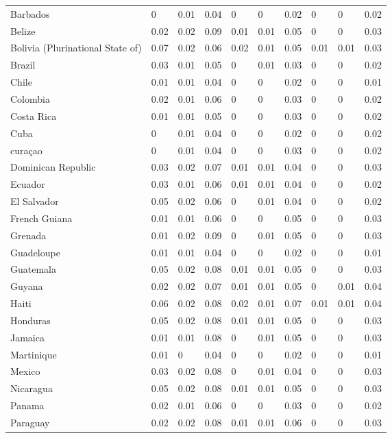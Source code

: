 \begin{longtable}[t]{llllllllll}
Barbados & 0 & 0.01 & 0.04 & 0 & 0 & 0.02 & 0 & 0 & 0.02\\
Belize & 0.02 & 0.02 & 0.09 & 0.01 & 0.01 & 0.05 & 0 & 0 & 0.03\\
Bolivia (Plurinational State of) & 0.07 & 0.02 & 0.06 & 0.02 & 0.01 & 0.05 & 0.01 & 0.01 & 0.03\\
Brazil & 0.03 & 0.01 & 0.05 & 0 & 0.01 & 0.03 & 0 & 0 & 0.02\\
Chile & 0.01 & 0.01 & 0.04 & 0 & 0 & 0.02 & 0 & 0 & 0.01\\
Colombia & 0.02 & 0.01 & 0.06 & 0 & 0 & 0.03 & 0 & 0 & 0.02\\
Costa Rica & 0.01 & 0.01 & 0.05 & 0 & 0 & 0.03 & 0 & 0 & 0.02\\
Cuba & 0 & 0.01 & 0.04 & 0 & 0 & 0.02 & 0 & 0 & 0.02\\
curaçao & 0 & 0.01 & 0.04 & 0 & 0 & 0.03 & 0 & 0 & 0.02\\
Dominican Republic & 0.03 & 0.02 & 0.07 & 0.01 & 0.01 & 0.04 & 0 & 0 & 0.03\\
Ecuador & 0.03 & 0.01 & 0.06 & 0.01 & 0.01 & 0.04 & 0 & 0 & 0.02\\
El Salvador & 0.05 & 0.02 & 0.06 & 0 & 0.01 & 0.04 & 0 & 0 & 0.02\\
French Guiana & 0.01 & 0.01 & 0.06 & 0 & 0 & 0.05 & 0 & 0 & 0.03\\
Grenada & 0.01 & 0.02 & 0.09 & 0 & 0.01 & 0.05 & 0 & 0 & 0.03\\
Guadeloupe & 0.01 & 0.01 & 0.04 & 0 & 0 & 0.02 & 0 & 0 & 0.01\\
Guatemala & 0.05 & 0.02 & 0.08 & 0.01 & 0.01 & 0.05 & 0 & 0 & 0.03\\
Guyana & 0.02 & 0.02 & 0.07 & 0.01 & 0.01 & 0.05 & 0 & 0.01 & 0.04\\
Haiti & 0.06 & 0.02 & 0.08 & 0.02 & 0.01 & 0.07 & 0.01 & 0.01 & 0.04\\
Honduras & 0.05 & 0.02 & 0.08 & 0.01 & 0.01 & 0.05 & 0 & 0 & 0.03\\
Jamaica & 0.01 & 0.01 & 0.08 & 0 & 0.01 & 0.05 & 0 & 0 & 0.03\\
Martinique & 0.01 & 0 & 0.04 & 0 & 0 & 0.02 & 0 & 0 & 0.01\\
Mexico & 0.03 & 0.02 & 0.08 & 0 & 0.01 & 0.04 & 0 & 0 & 0.03\\
Nicaragua & 0.05 & 0.02 & 0.08 & 0.01 & 0.01 & 0.05 & 0 & 0 & 0.03\\
Panama & 0.02 & 0.01 & 0.06 & 0 & 0 & 0.03 & 0 & 0 & 0.02\\
Paraguay & 0.02 & 0.02 & 0.08 & 0.01 & 0.01 & 0.06 & 0 & 0 & 0.03\\

\end{longtable}
